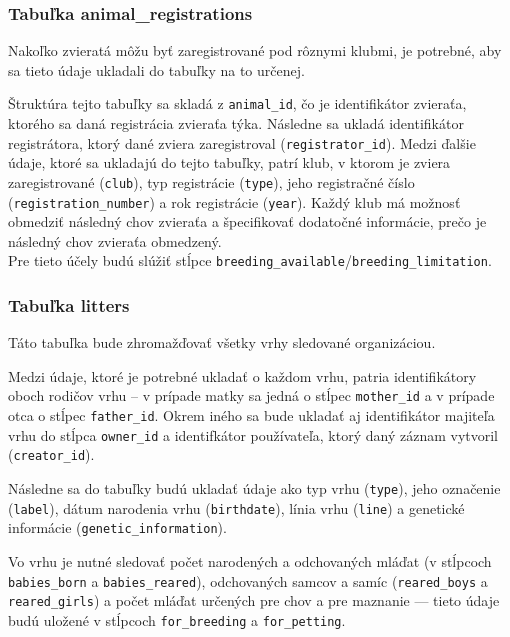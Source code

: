 \subsubsection*{Tabuľka animal\_registrations}
Nakoľko zvieratá môžu byť zaregistrované pod rôznymi klubmi, je potrebné, aby sa tieto údaje ukladali do tabuľky na to určenej.

Štruktúra tejto tabuľky sa skladá z \texttt{animal_id}, čo je identifikátor zvieraťa, ktorého sa daná registrácia zvieraťa týka. Následne sa ukladá identifikátor registrátora, ktorý dané zviera zaregistroval (\texttt{registrator_id}). Medzi ďalšie údaje, ktoré sa ukladajú do tejto tabuľky, patrí klub, v ktorom je zviera zaregistrované (\texttt{club}), typ registrácie (\texttt{type}), jeho registračné číslo \\ (\texttt{registration_number}) a rok registrácie (\texttt{year}). 
Každý klub má možnosť obmedziť následný chov zvieraťa a špecifikovať dodatočné informácie, prečo je následný chov zvieraťa obmedzený. \\ Pre tieto účely budú slúžiť stĺpce \texttt{breeding_available}/\texttt{breeding_limitation}.

\subsubsection*{Tabuľka litters}
Táto tabuľka bude zhromažďovať všetky vrhy sledované organizáciou.

Medzi údaje, ktoré je potrebné ukladať o každom vrhu, patria identifikátory oboch rodičov vrhu -- v prípade matky sa jedná o stĺpec \texttt{mother_id} a v prípade otca o stĺpec \texttt{father_id}. Okrem iného sa bude ukladať aj identifikátor majiteľa vrhu do stĺpca \texttt{owner_id} a identifkátor používateľa, ktorý daný záznam vytvoril (\texttt{creator_id}).

Následne sa do tabuľky budú ukladať údaje ako typ vrhu (\texttt{type}), jeho označenie (\texttt{label}), dátum narodenia vrhu (\texttt{birthdate}), línia vrhu (\texttt{line}) a genetické informácie (\texttt{genetic_information}).

Vo vrhu je nutné sledovať počet narodených a odchovaných mláďat (v stĺpcoch \texttt{babies_born} a \texttt{babies_reared}), odchovaných samcov a samíc (\texttt{reared_boys} a \texttt{reared_girls}) a počet mláďat určených pre chov a pre maznanie --- tieto údaje budú uložené v stĺpcoch \texttt{for_breeding} a \texttt{for_petting}.

